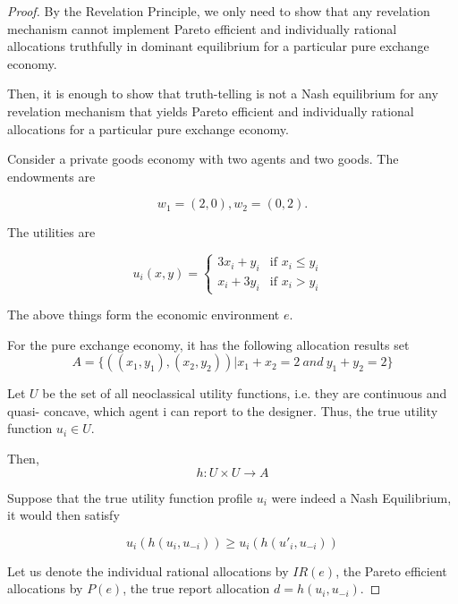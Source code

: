 \begin{proof}

  By the Revelation Principle, we only need to show that any
  revelation mechanism cannot implement Pareto efficient and
  individually rational allocations truthfully in dominant equilibrium
  for a particular pure exchange economy.

Then, it is enough
to show that truth-telling is not a Nash equilibrium for any revelation mechanism that
yields Pareto efficient and individually rational allocations for a particular pure exchange
economy.

Consider a private goods economy with two agents and  two goods. The
endowments are 

$$w_1=(2,0), w_2=(0,2).$$

The utilities are

$$ u_i(x,y) = \begin{cases}
3x_i + y_i & \text{if $x_i\leq y_i$ } \\
x_i + 3y_i & \text{if $x_i>y_i$ }
\end{cases}$$

The above things form the economic environment $e$.

For the pure exchange economy, it has the following
allocation results set 
$$ A =\{( (x_1,y_1), (x_2,y_2))| x_1+x_2 = 2 \ and\ y_1+y_2=2 \}$$

Let $U$ be the set of all neoclassical utility functions, i.e. they are continuous and quasi-
concave, which agent i can report to the designer. Thus, the true utility function
$u_i \in U$.

Then, 
$$ h: U\times U \rightarrow A $$

Suppose that  the true utility function profile
$u_i$ were indeed a Nash Equilibrium, it would then  satisfy

\[ u_i(h(u_i, u_{-i})) \geq u_i(h(u'_i,u_{-i}))\]


Let us denote the individual rational allocations by $IR(e)$, the
Pareto efficient allocations by $P(e)$, the true report allocation
$d=h(u_i, u_{-i})$.


\end{proof}
